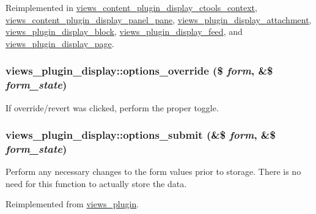 Reimplemented in \hyperlink{classviews__content__plugin__display__ctools__context_a7915e29e242e5accfa74ea8ceaa20b90}{views\_\-content\_\-plugin\_\-display\_\-ctools\_\-context}, \hyperlink{classviews__content__plugin__display__panel__pane_a9ae46f16b092629f3222cd0e0f65d0f9}{views\_\-content\_\-plugin\_\-display\_\-panel\_\-pane}, \hyperlink{classviews__plugin__display__attachment_a82864b279fb83e8d9ebddc40bc2851fa}{views\_\-plugin\_\-display\_\-attachment}, \hyperlink{classviews__plugin__display__block_a251f0aa56cead04c51c4b1d633826640}{views\_\-plugin\_\-display\_\-block}, \hyperlink{classviews__plugin__display__feed_abe0a41d577b52de992279986d6c8c2d9}{views\_\-plugin\_\-display\_\-feed}, and \hyperlink{classviews__plugin__display__page_aa8267a4774b92a7b47a3768ac98aac36}{views\_\-plugin\_\-display\_\-page}.\hypertarget{classviews__plugin__display_a6628fc7addb8376633ff63889e37256e}{
\subsubsection[{options\_\-override}]{\setlength{\rightskip}{0pt plus 5cm}views\_\-plugin\_\-display::options\_\-override (\$ {\em form}, \/  \&\$ {\em form\_\-state})}}
\label{classviews__plugin__display_a6628fc7addb8376633ff63889e37256e}
If override/revert was clicked, perform the proper toggle. \hypertarget{classviews__plugin__display_a75f0b2d5587b365640fcb4d414daae36}{
\subsubsection[{options\_\-submit}]{\setlength{\rightskip}{0pt plus 5cm}views\_\-plugin\_\-display::options\_\-submit (\&\$ {\em form}, \/  \&\$ {\em form\_\-state})}}
\label{classviews__plugin__display_a75f0b2d5587b365640fcb4d414daae36}
Perform any necessary changes to the form values prior to storage. There is no need for this function to actually store the data. 

Reimplemented from \hyperlink{classviews__plugin_a442b0f392deb52725ec8159e05654e06}{views\_\-plugin}.

